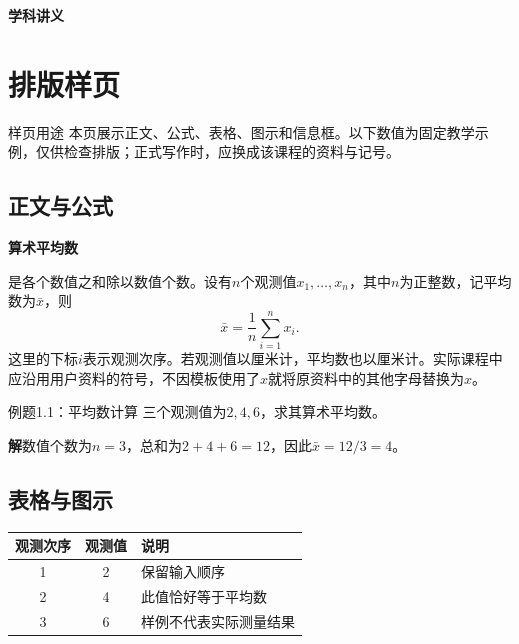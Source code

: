 \documentclass[UTF8,fontset=none,zihao=-4,a4paper]{ctexart}
\newcommand{\LectureTitle}{学科讲义}
\newcommand{\LectureCoverSize}{36pt}
\newcommand{\LectureCoverOffset}{0.28\textheight}
\newcommand{\termdef}[2]{\hypertarget{term:#1}{\textbf{#2}}}
\newcommand{\sol}{\par\noindent\textbf{解}\quad}
\numberwithin{equation}{section}
\begin{document}
\begin{titlepage}\thispagestyle{empty}\vspace*{\LectureCoverOffset}
\begin{center}{\fontsize{\LectureCoverSize}{45pt}\selectfont\bfseries\LectureTitle}\end{center}
\end{titlepage}
\thispagestyle{empty}\tableofcontents
\clearpage{}

\section{排版样页}\label{ch:sample}
\begin{infobox}{样页用途}
本页展示正文、公式、表格、图示和信息框。以下数值为固定教学示例，仅供检查排版；正式写作时，应换成该课程的资料与记号。
\end{infobox}

\subsection{正文与公式}
\termdef{mean}{算术平均数}是各个数值之和除以数值个数。设有$n$个观测值$x_1,\ldots,x_n$，其中$n$为正整数，记平均数为$\bar{x}$，则
\begin{equation}\bar{x}=\frac{1}{n}\sum_{i=1}^{n}x_i.\end{equation}
这里的下标$i$表示观测次序。若观测值以厘米计，平均数也以厘米计。实际课程中应沿用用户资料的符号，不因模板使用了$x$就将原资料中的其他字母替换为$x$。

\begin{infobox}{例题1.1：平均数计算}
三个观测值为$2,4,6$，求其算术平均数。
\end{infobox}
\sol 数值个数为$n=3$，总和为$2+4+6=12$，因此$\bar{x}=12/3=4$。

\subsection{表格与图示}
\begin{center}
\begin{tabularx}{\linewidth}{c c Y}
\toprule
观测次序 & 观测值 & 说明\\ & 2 & 保留输入顺序\\
2 & 4 & 此值恰好等于平均数\\
3 & 6 & 样例不代表实际测量结果\\
\bottomrule
\end{tabularx}
\end{center}
\end{document}
